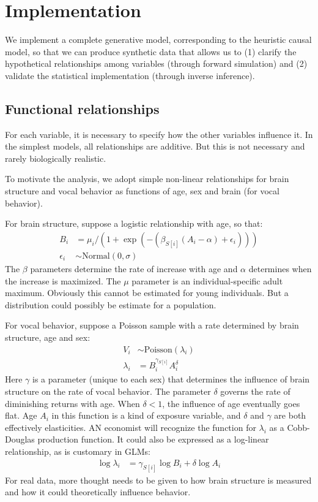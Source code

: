 \documentclass[reqno ,11pt]{amsart}
\begin{document}
\section{Implementation}

We implement a complete generative model, corresponding to the heuristic causal model, so that we can produce synthetic data that allows us to (1) clarify the hypothetical relationships among variables (through forward simulation) and (2) validate the statistical implementation (through inverse inference).

\subsection{Functional relationships}

For each variable, it is necessary to specify how the other variables influence it. In the simplest models, all relationships are additive. But this is not necessary and rarely biologically realistic.

To motivate the analysis, we adopt simple non-linear relationships for brain structure and vocal behavior as functions of age, sex and brain (for vocal behavior). 

For brain structure, suppose a logistic relationship with age, so that:
\begin{align*}
  B_i &= \mu_i/(1+\exp( -(\beta_{S[i]} (A_i-\alpha) + \epsilon_i ) ))\\
  \epsilon_i &\sim \text{Normal}(0,\sigma)
\end{align*}
The $\beta$ parameters determine the rate of increase with age and $\alpha$ determines when the increase is maximized. The $\mu$ parameter is an individual-specific adult maximum. Obviously this cannot be estimated for young individuals. But a distribution could possibly be estimate for a population.

For vocal behavior, suppose a Poisson sample with a rate determined by brain structure, age and sex:
\begin{align*}
  V_i &\sim \text{Poisson}(\lambda_i)\\
  \lambda_i &=   B_i^{\gamma_{S[i]}}  A_i^\delta
\end{align*}
Here $\gamma$ is a parameter (unique to each sex) that determines the influence of brain structure on the rate of vocal behavior. The parameter $\delta$ governs the rate of diminishing returns with age. When $\delta<1$, the influence of age eventually goes flat. Age $A_i$ in this function is a kind of exposure variable, and $\delta$ and $\gamma$ are both effectively elasticities. AN economist will recognize the function for $\lambda_i$ as a Cobb-Douglas production function. It could also be expressed as a log-linear relationship, as is customary in GLMs:
\begin{align*}
  \log \lambda_i &=  \gamma_{S[i]} \log B_i + \delta \log A_i
\end{align*}
For real data, more thought needs to be given to how brain structure is measured and how it could theoretically influence behavior.
\end{document}
